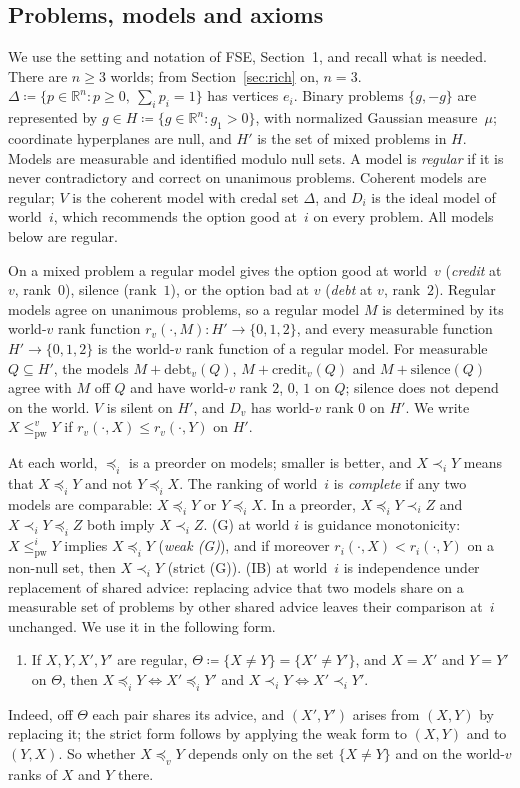 \documentclass[11pt]{article}
\theoremstyle{definition}\newtheorem{definition}[theorem]{Definition}
\theoremstyle{remark}\newtheorem{remark}[theorem]{Remark}
\newcommand{\R}{\mathbb R}
\newcommand{\debt}{\mathrm{debt}}
\newcommand{\cred}{\mathrm{credit}}
\newcommand{\sil}{\mathrm{silence}}
\newcommand{\pw}{\mathrm{pw}}
\begin{document}
\subsection{Problems, models and axioms}\label{sec:axioms}

We use the setting and notation of FSE, Section~1, and recall what is
needed. There are $n\ge3$ worlds; from Section~\ref{sec:rich} on, $n=3$.
$\Delta\coloneqq\{p\in\R^n:p\ge0,\ \sum_ip_i=1\}$ has vertices $e_i$.
Binary problems $\{g,-g\}$ are represented by $g\in
H\coloneqq\{g\in\R^n:g_1>0\}$, with normalized Gaussian measure~$\mu$;
coordinate hyperplanes are null, and $H'$ is the set of mixed problems in
$H$. Models are measurable and identified modulo null sets. A model is
\emph{regular} if it is never contradictory and correct on unanimous
problems. Coherent models are regular; $V$ is the coherent model with credal
set $\Delta$, and $D_i$ is the ideal model of world~$i$, which recommends
the option good at~$i$ on every problem. All models below are regular.

On a mixed problem a regular model gives the option good at world~$v$
(\emph{credit} at $v$, rank~$0$), silence (rank~$1$), or the option bad at
$v$ (\emph{debt} at $v$, rank~$2$). Regular models agree on unanimous
problems, so a regular model $M$ is determined by its world-$v$ rank
function $r_v(\cdot,M)\colon H'\to\{0,1,2\}$, and every measurable function
$H'\to\{0,1,2\}$ is the world-$v$ rank function of a regular model. For
measurable $Q\subseteq H'$, the models $M+\debt_v(Q)$, $M+\cred_v(Q)$ and
$M+\sil(Q)$ agree with $M$ off $Q$ and have world-$v$ rank $2$, $0$, $1$ on
$Q$; silence does not depend on the world. $V$ is silent on $H'$, and $D_v$
has world-$v$ rank $0$ on $H'$. We write $X\le^v_\pw Y$ if
$r_v(\cdot,X)\le r_v(\cdot,Y)$ on $H'$.

At each world, $\preceq_i$ is a preorder on models; smaller is better, and
$X\prec_iY$ means that $X\preceq_iY$ and not $Y\preceq_iX$. The ranking of
world~$i$ is \emph{complete} if any two models are comparable: $X\preceq_iY$
or $Y\preceq_iX$. In a preorder,
$X\preceq_iY\prec_iZ$ and $X\prec_iY\preceq_iZ$ both imply $X\prec_iZ$.
(G) at world $i$ is guidance monotonicity: $X\le^i_\pw Y$ implies
$X\preceq_iY$ (\emph{weak (G)}), and if moreover
$r_i(\cdot,X)<r_i(\cdot,Y)$ on a non-null set, then $X\prec_iY$ (strict
(G)). (IB) at world~$i$ is independence under replacement of shared advice:
replacing advice that two models share on a measurable set of problems by
other shared advice leaves their comparison at~$i$ unchanged. We use it in
the following form.
\begin{enumerate}[label=(IB$'$),leftmargin=*]
\item If $X,Y,X',Y'$ are regular, $\Theta\coloneqq\{X\ne Y\}=\{X'\ne Y'\}$,
and $X=X'$ and $Y=Y'$ on $\Theta$, then $X\preceq_iY\iff X'\preceq_iY'$ and
$X\prec_iY\iff X'\prec_iY'$.
\end{enumerate}
Indeed, off $\Theta$ each pair shares its advice, and $(X',Y')$ arises from
$(X,Y)$ by replacing it; the strict form follows by applying the weak form
to $(X,Y)$ and to $(Y,X)$. So whether $X\preceq_vY$ depends only on the set
$\{X\ne Y\}$ and on the world-$v$ ranks of $X$ and $Y$ there.
\end{document}
